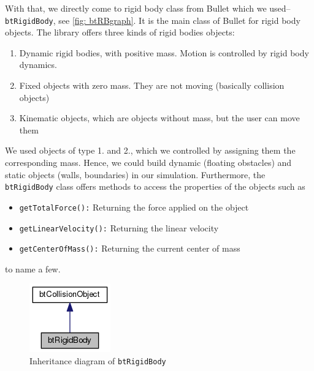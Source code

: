 With that, we directly come to rigid body class from Bullet which we used-- \verb+btRigidBody+, see \autoref{fig: btRBgraph}. It is the main class of Bullet for rigid body objects. The library offers three kinds of rigid bodies objects:
\begin{enumerate}
\item Dynamic rigid bodies, with positive mass. Motion is controlled by rigid body dynamics.
\item Fixed objects with zero mass. They are not moving (basically collision objects)
\item Kinematic objects, which are objects without mass, but the user can move them
\end{enumerate}
We used objects of type 1. and 2., which we controlled by assigning them the corresponding mass. Hence, we could build dynamic (floating obstacles) and static objects (walls, boundaries) in our simulation. Furthermore, the \texttt{btRigidBody} class offers methods to access the properties of the objects such as 
\begin{itemize}
\item \texttt{getTotalForce():} Returning the force applied on the object
\item \texttt{getLinearVelocity():} Returning the linear velocity
\item \texttt{getCenterOfMass():} Returning the current center of mass
\end{itemize}
to name a few. 
\begin{figure}
\centering
\includegraphics[scale=0.5]{img/RigidBodies/btRigidBodyGraph.png}
\caption{Inheritance diagram of \texttt{btRigidBody}}
\label{fig: btRBgraph}
\end{figure}



